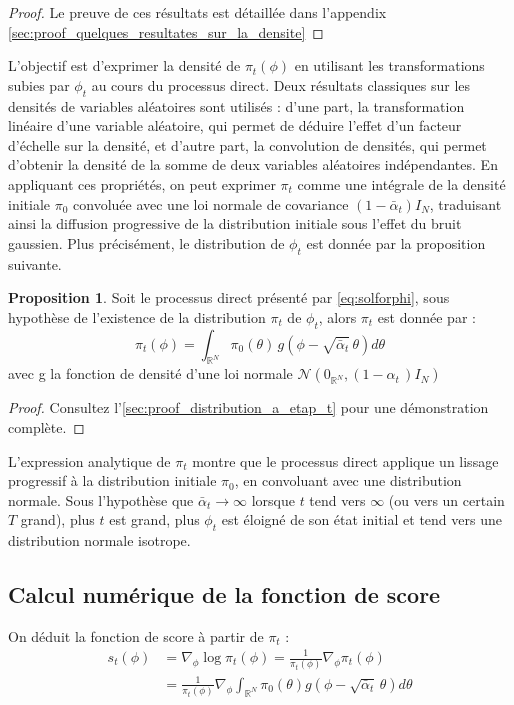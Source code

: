 \documentclass[a4paper,10pt]{article}
\theoremstyle{definition} %
\theoremstyle{definition} %
\newtheorem{proposition}[definition]{Proposition}
\theoremstyle{definition} %
\theoremstyle{definition} %
\newcommand{\R}{\mathbb{R}}
\begin{document}
\begin{proof}
    Le preuve de ces résultats est détaillée dans l'appendix \cref{sec:proof_quelques_resultates_sur_la_densite}
\end{proof}

L’objectif est d’exprimer la densité de \(\pi_t(\phi)\) en utilisant les transformations subies par \(\phi_t\) au cours du processus direct. Deux résultats classiques sur les densités de variables aléatoires sont utilisés : d’une part, la transformation linéaire d’une variable aléatoire, qui permet de déduire l’effet d’un facteur d’échelle sur la densité, et d’autre part, la convolution de densités, qui permet d’obtenir la densité de la somme de deux variables aléatoires indépendantes. En appliquant ces propriétés, on peut exprimer \(\pi_t\) comme une intégrale de la densité initiale \(\pi_0\) convoluée avec une loi normale de covariance \((1 - \bar{\alpha}_t) I_N\), traduisant ainsi la diffusion progressive de la distribution initiale sous l’effet du bruit gaussien. Plus précisément, le distribution de $\phi_t$ est donnée par la proposition suivante.

\begin{proposition}\label{prop:distribution_a_etap_t}
    Soit le processus direct présenté par \cref{eq:solforphi}, sous hypothèse de l'existence de la distribution $\pi_t$ de $\phi_t$, alors $\pi_t$ est donnée par :
    \begin{equation}\label{eq:distribution_pi_t}
        \pi_t(\phi) = \int_{\R^N} \pi_0(\theta)\, g(\phi - \sqrt{\bar \alpha_t}\,\theta) d\theta
    \end{equation}
    avec g la fonction de densité d'une loi normale $\mathcal{N}\left(0_{\R^N}, (1- \alpha _t \,)I_N\right)$
\end{proposition}

\begin{proof}
    Consultez l'\cref{sec:proof_distribution_a_etap_t} pour une démonstration complète.
\end{proof}

L'expression analytique de $\pi_t$ montre que le processus direct applique un lissage progressif à la distribution initiale $\pi_0$, en convoluant avec une distribution normale. Sous l'hypothèse que $\bar \alpha_t \rightarrow \infty$ lorsque $t$ tend vers $\infty$ (ou vers un certain $T$ grand), plus $t$ est grand, plus $\phi_t$ est éloigné de son état initial et tend vers une distribution normale isotrope.
\subsection{Calcul numérique de la fonction de score}
On déduit la fonction de score à partir de $\pi_t$ :
\begin{align*}
        s_t(\phi) &= \nabla_\phi \log \pi_t(\phi) = \frac{1}{\pi_t(\phi)}\nabla_\phi\pi_t(\phi) \\
        &= \frac{1}{\pi_t(\phi)}\nabla_\phi\int_{\R^N} \pi_0(\theta) g(\phi - \sqrt{\bar \alpha_t} \,\theta) d\theta\\
\end{align*}
\end{document}

